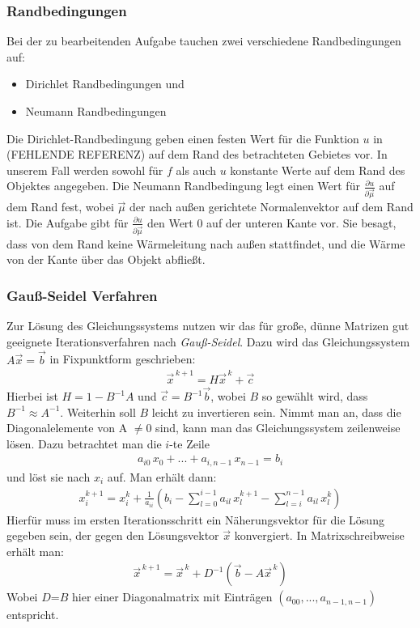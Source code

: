 \documentclass[10pt,a4paper]{article}
\begin{document}
\subsubsection{Randbedingungen}
\label{randbedingungen}
Bei der zu bearbeitenden Aufgabe tauchen zwei verschiedene Randbedingungen auf:
\begin{itemize}
\item Dirichlet Randbedingungen und
\item Neumann Randbedingungen
\end{itemize}
Die Dirichlet-Randbedingung geben einen festen Wert für die Funktion $u$ in (FEHLENDE REFERENZ) auf dem Rand des betrachteten Gebietes vor. In unserem Fall werden sowohl für $f$ als auch $u$ konstante Werte auf dem Rand des Objektes angegeben. Die Neumann Randbedingung legt einen Wert für $\frac{\partial u}{\partial \vec{\mu}}$ auf dem Rand fest, wobei $\vec{\mu}$ der nach außen gerichtete Normalenvektor auf dem Rand ist. Die Aufgabe gibt für $\frac{\partial u}{\partial \vec{\mu}}$ den Wert $0$ auf der unteren Kante vor. Sie besagt, dass von dem Rand keine Wärmeleitung nach außen stattfindet, und die Wärme von der Kante über das Objekt abfließt.

\subsubsection{Gauß-Seidel Verfahren}
\label{sec:gauss-seidel}
Zur Lösung des Gleichungssystems nutzen wir das für große, dünne Matrizen gut geeignete Iterationsverfahren nach \emph{Gauß-Seidel}. Dazu wird das Gleichungssystem $A\vec{x}=\vec{b}$ in Fixpunktform geschrieben:
\begin{align}
\vec{x}^{\,k+1}=H\vec{x}^{\,k}+\vec{c}
\end{align}
Hierbei ist $H=1-B^{-1}A$ und $\vec{c}=B^{-1}\vec{b}$, wobei $B$ so gewählt wird, dass $B^{-1}\approx A^{-1}$. Weiterhin soll $B$ leicht zu invertieren sein. Nimmt man an, dass die Diagonalelemente von A $\not=0$ sind, kann man das Gleichungssystem zeilenweise lösen. Dazu betrachtet man die $i$-te Zeile
\begin{align}
a_{i0}\,x_0+...+a_{i,n-1}\,x_{n-1}=b_i
\end{align}
und löst sie nach $x_i$ auf. Man erhält dann:
\begin{align}
x_i^{k+1}=x^k_i+\frac{1}{a_{ii}}\left( b_i-\sum_{l=0}^{i-1}a_{il}\,x_l^{k+1} - \sum_{l=i}^{n-1}a_{il}\,x_l^k\right)
\end{align}
Hierfür muss im ersten Iterationsschritt ein Näherungsvektor für die Lösung gegeben sein, der gegen den Lösungsvektor $\vec{x}$ konvergiert. In Matrixschreibweise erhält man:
\begin{align}
\vec{x}^{\,k+1}=\vec{x}^{\,k}+D^{-1}\left(\vec{b}-A\vec{x}^{\,k}\right)
\end{align}
Wobei $D$=$B$ hier einer Diagonalmatrix mit Einträgen $(a_{00}, ... ,a_{n-1,n-1})$ entspricht.
\end{document}
